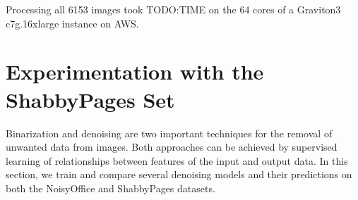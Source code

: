 \documentclass[runningheads]{llncs}
\begin{document}
Processing all 6153 images took TODO:TIME on the 64 cores of a Graviton3 c7g.16xlarge instance on AWS.

\section{Experimentation with the ShabbyPages Set}
Binarization and denoising are two important techniques for the removal of unwanted data from images. Both approaches can be achieved by supervised learning of relationships between features of the input and output data. In this section, we train and compare several denoising models and their predictions on both the NoisyOffice and ShabbyPages datasets.

\



%
%
%
% 
% 
%
\end{document}
